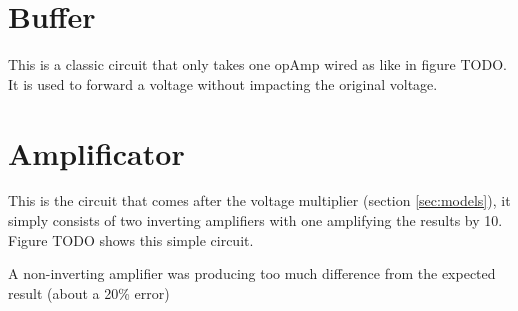 \label{ap:a}

\section{Buffer}\label{apsec:buffer}

This is a classic circuit that only takes one \ac{opAmp} wired as like in figure TODO. It is used to forward a voltage without impacting the original voltage.

\section{Amplificator}\label{apsec:amp}

This is the circuit that comes after the voltage multiplier (section \ref{sec:models}), it simply consists of two inverting amplifiers with one amplifying the results by 10. Figure TODO shows this simple circuit.

A non-inverting amplifier was producing too much difference from the expected result (about a 20\% error) %
